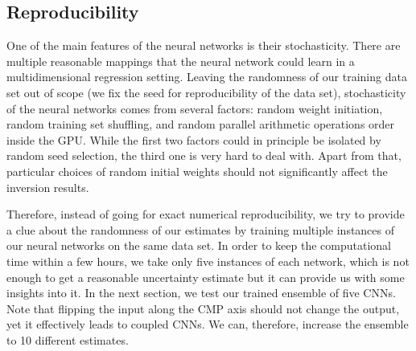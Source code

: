 \documentclass[paper,twocolomn]{geophysics}
\begin{document}

\subsection{Reproducibility}
One of the main features of the neural networks is their stochasticity. There are multiple reasonable mappings that the neural network could learn in a multidimensional regression setting. Leaving the randomness of our training data set out of scope (we fix the seed for reproducibility of the data set), stochasticity of the neural networks comes from several factors: random weight initiation, random training set shuffling, and random parallel arithmetic operations order inside the GPU. While the first two factors could in principle be isolated by random seed selection, the third one is very hard to deal with. Apart from that, particular choices of random initial weights should not significantly affect the inversion results.

Therefore, instead of going for exact numerical reproducibility, we try to provide a clue about the randomness of our estimates by training multiple instances of our neural networks on the same data set. In order to keep the computational time within a few hours, we take only five instances of each network, which is not enough to get a reasonable uncertainty estimate but it can provide us with some insights into it. In the next section, we test our trained ensemble of five CNNs. Note that flipping the input along the CMP axis should not change the output, yet it effectively leads to coupled CNNs. We can, therefore, increase the ensemble to 10 different estimates.

\end{document}
